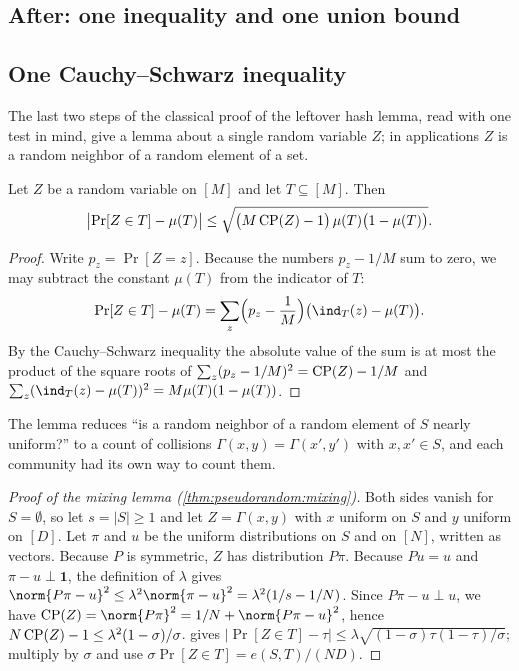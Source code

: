 \begin{refsection}
\section{After: one inequality and one union bound}\label{sec:pseudorandom:after1}

\subsection{One Cauchy--Schwarz inequality}\label{sec:pseudorandom:collision}

The last two steps of the classical proof of the leftover hash lemma, read with one test in mind, give a lemma about a single random variable $Z$; in applications $Z$ is a random neighbor of a random element of a set.

\begin{lemma}\label{lem:pseudorandom:collision}
Let $Z$ be a random variable on $[M]$ and let $T\subseteq[M]$. Then
\[
  \bigl|\Pr[Z\in T]-\mu(T)\bigr|\le\sqrt{\bigl(M\operatorname{CP}(Z)-1\bigr)\,\mu(T)\bigl(1-\mu(T)\bigr)}.
\]
\end{lemma}

\begin{proof}
Write $p_z=\Pr[Z=z]$. Because the numbers $p_z-1/M$ sum to zero, we may subtract the constant $\mu(T)$ from the indicator of $T$:
\[
  \Pr[Z\in T]-\mu(T)=\sum_z\Bigl(p_z-\frac1M\Bigr)\bigl(\ind_T(z)-\mu(T)\bigr).
\]
By the Cauchy--Schwarz inequality the absolute value of the sum is at most the product of the square roots of $\sum_z(p_z-1/M)^2=\operatorname{CP}(Z)-1/M$ and $\sum_z(\ind_T(z)-\mu(T))^2=M\mu(T)(1-\mu(T))$.
\end{proof}

The lemma reduces ``is a random neighbor of a random element of $S$ nearly uniform?'' to a count of collisions $\Gamma(x,y)=\Gamma(x',y')$ with $x,x'\in S$, and each community had its own way to count them.

\begin{proof}[Proof of the mixing lemma (\cref{thm:pseudorandom:mixing})]
Both sides vanish for $S=\emptyset$, so let $s=|S|\ge1$ and let $Z=\Gamma(x,y)$ with $x$ uniform on $S$ and $y$ uniform on $[D]$. Let $\pi$ and $u$ be the uniform distributions on $S$ and on $[N]$, written as vectors. Because $P$ is symmetric, $Z$ has distribution $P\pi$. Because $Pu=u$ and $\pi-u\perp\mathbf1$, the definition of $\lambda$ gives $\norm{P\pi-u}^2\le\lambda^2\norm{\pi-u}^2=\lambda^2(1/s-1/N)$. Since $P\pi-u\perp u$, we have $\pseudorandomCP(Z)=\norm{P\pi}^2=1/N+\norm{P\pi-u}^2$, hence $N\operatorname{CP}(Z)-1\le\lambda^2(1-\sigma)/\sigma$.  gives $|\Pr[Z\in T]-\tau|\le\lambda\sqrt{(1-\sigma)\tau(1-\tau)/\sigma}$; multiply by $\sigma$ and use $\sigma\Pr[Z\in T]=e(S,T)/(ND)$.
\end{proof}


\end{refsection}
